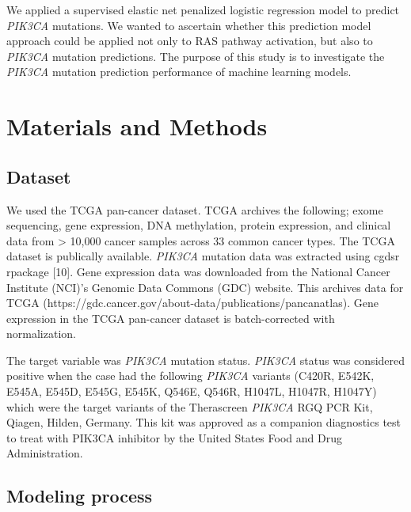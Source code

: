 \documentclass[10pt,letterpaper]{article}
\begin{document}
We applied a supervised elastic net penalized logistic regression model
to predict \emph{PIK3CA} mutations. We wanted to ascertain whether this
prediction model approach could be applied not only to RAS pathway
activation, but also to \emph{PIK3CA} mutation predictions. The purpose
of this study is to investigate the \emph{PIK3CA} mutation prediction
performance of machine learning models.

\hypertarget{materials-and-methods}{%
\section{Materials and Methods}\label{materials-and-methods}}

\hypertarget{dataset}{%
\subsection{Dataset}\label{dataset}}

We used the TCGA pan-cancer dataset. TCGA archives the following; exome
sequencing, gene expression, DNA methylation, protein expression, and
clinical data from \textgreater{} 10,000 cancer samples across 33 common
cancer types. The TCGA dataset is publically available. \emph{PIK3CA}
mutation data was extracted using cgdsr rpackage {[}10{]}. Gene
expression data was downloaded from the National Cancer Institute
(NCI)'s Genomic Data Commons (GDC) website. This archives data for TCGA
(https://gdc.cancer.gov/about-data/publications/pancanatlas). Gene
expression in the TCGA pan-cancer dataset is batch-corrected with
normalization.

The target variable was \emph{PIK3CA} mutation status. \emph{PIK3CA}
status was considered positive when the case had the following
\emph{PIK3CA} variants (C420R, E542K, E545A, E545D, E545G, E545K, Q546E,
Q546R, H1047L, H1047R, H1047Y) which were the target variants of the
Therascreen \emph{PIK3CA} RGQ PCR Kit, Qiagen, Hilden, Germany. This kit
was approved as a companion diagnostics test to treat with PIK3CA
inhibitor by the United States Food and Drug Administration.

\hypertarget{modeling-process}{%
\subsection{Modeling process}\label{modeling-process}}
\end{document}
